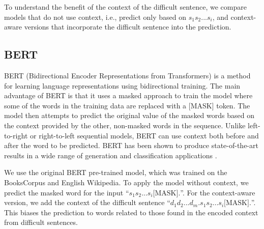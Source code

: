 \documentclass[11pt]{article}
\begin{document}
To understand the benefit of the context of the difficult sentence, we compare models that do not use context, i.e., predict only based on $s_1 s_2 ... s_i$, and context-aware versions that incorporate the difficult sentence into the prediction.



\subsection{BERT}


BERT (Bidirectional Encoder Representations from Transformers) is a method for learning language representations using bidirectional training.  The main advantage of BERT is that it uses a masked approach to train the model where some of the words in the training data are replaced with a [MASK] token. The model then attempts to predict the original value of the masked words based on the context provided by the other, non-masked words in the sequence.  Unlike left-to-right or right-to-left sequential models, BERT can use context both before and after the word to be predicted.  BERT has been shown to produce state-of-the-art results in a wide range of generation and classification applications \cite{devlin2018bert}.

We use the original BERT pre-trained model, which was trained on the BooksCorpus \cite{zhu2015aligning} and English Wikipedia. To apply the model without context, we predict the masked word for the input ``$s_1 s_2 ... s_i \mbox{[MASK]} .$''. For the context-aware version, we add the context of the difficult sentence
``$d_1 d_2 ... d_m. s_1 s_2 ... s_i \mbox{[MASK]} .$''. This biases the prediction to words related to those found in the encoded context from difficult sentences.
\end{document}
